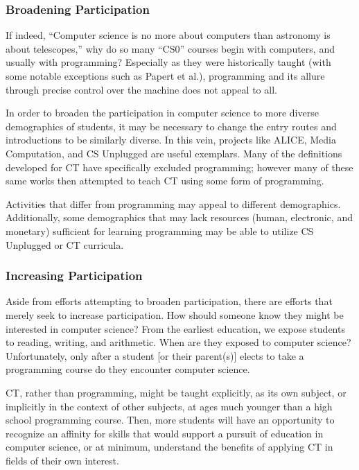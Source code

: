 \documentclass{acm_proc_article-sp}
\begin{document}
\subsubsection{Broadening Participation}
If indeed, ``Computer science is no more about computers than astronomy is about telescopes,''\cite{cs-astronomy} why do so many ``CS0'' courses begin with computers, and usually with programming? Especially as they were historically taught (with some notable exceptions such as Papert et al.)\cite{logo-readings}, programming and its allure through precise control over the machine does not appeal to all.

In order to broaden the participation in computer science to more diverse demographics of students, it may be necessary to change the entry routes and introductions to be similarly diverse. In this vein, projects like ALICE\cite{pausch1995alice}, Media Computation\cite{guzdial2003media}, and CS Unplugged\cite{csunplugged} are useful exemplars. Many of the definitions developed for CT have specifically excluded programming; however many of these same works then attempted to teach CT using some form of programming.

Activities that differ from programming may appeal to different demographics. Additionally, some demographics that may lack resources (human, electronic, and monetary) sufficient for learning programming may be able to utilize CS Unplugged or CT curricula.

\subsubsection{Increasing Participation}
Aside from efforts attempting to broaden participation, there are efforts that merely seek to increase participation. How should someone know they might be interested in computer science? From the earliest education, we expose students to reading, writing, and arithmetic. When are they exposed to computer science? Unfortunately, only after a student [or their parent(s)] elects to take a programming course do they encounter computer science. 

CT, rather than programming, might be taught explicitly, as its own subject, or implicitly in the context of other subjects, at ages much younger than a high school programming course. Then, more students will have an opportunity to recognize an affinity for skills that would support a pursuit of education in computer science, or at minimum, understand the benefits of applying CT in fields of their own interest.
\end{document}
